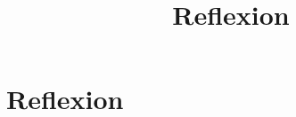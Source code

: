 \documentclass[12pt]{article}
\title{Reflexion}
\begin{document}
\section*{Reflexion}
\end{document}
